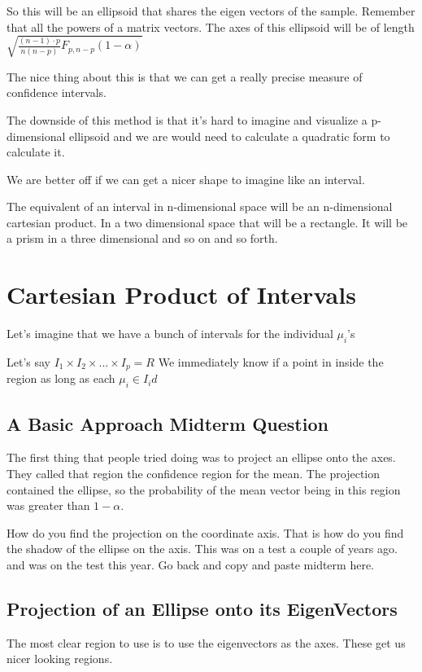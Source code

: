 So this will be an ellipsoid that shares the eigen vectors of the sample. Remember that all the powers of a matrix vectors. The axes of this ellipsoid will be of length $\sqrt{\frac{(n-1)\cdot p}{n(n-p)}F_{p,n-p}(1-\alpha)}$

The nice thing about this is that we can get a really precise measure of confidence intervals.

The downside of this method is that it's hard to imagine and visualize a p-dimensional ellipsoid and we are would need to calculate a quadratic form to calculate it.

We are better off if we can get a nicer shape to imagine like an interval.

The equivalent of an interval in n-dimensional space will be an n-dimensional cartesian product. In a two dimensional space that will be a rectangle. It will be a prism in a three dimensional and so on and so forth.

\section{Cartesian Product of Intervals}
Let's imagine that we have a bunch of intervals for the individual $\mu_i$'s

Let's say $I_1 \times I_2 \times ... \times I_p = R$ We immediately know if a point in inside the region as long as each $\mu_i \in I_id$

\subsection{A Basic Approach Midterm Question}
The first thing that people tried doing was to project an ellipse onto the axes. They called that region the confidence region for the mean. The projection contained the ellipse, so the probability of the mean vector being in this region was greater than $1-\alpha$.

How do you find the projection on the coordinate axis. That is how do you find the shadow of the ellipse on the axis. This was on a test a couple of years ago. and was on the test this year. Go back and copy and paste midterm here.

\subsection{Projection of an Ellipse onto its EigenVectors}

The most clear region to use is to use the eigenvectors as the axes. These get us nicer looking regions.

